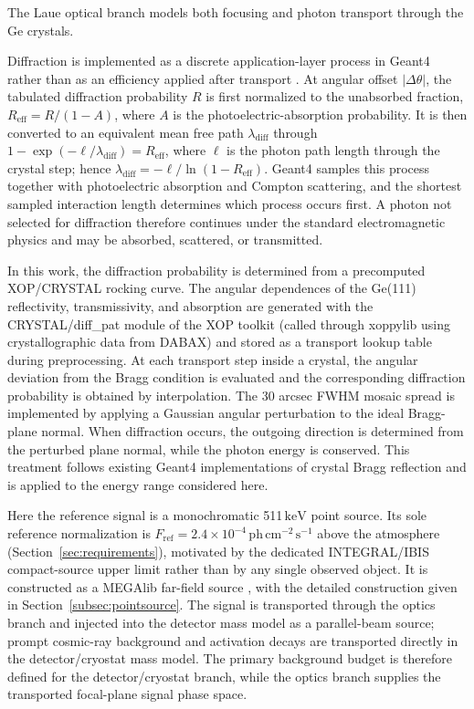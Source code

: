 \documentclass[11pt]{article}
\newcommand{\keV}{\ensuremath{\,\mathrm{keV}}}
\newcommand{\phcms}{\ensuremath{\,\mathrm{ph\,cm^{-2}\,s^{-1}}}}
\newcommand{\fref}{F_{\mathrm{ref}}}
\begin{document}
The Laue optical branch models both focusing and photon transport through the Ge crystals.

Diffraction is implemented as a discrete application-layer process in Geant4 rather than as an efficiency applied after transport \cite{Agostinelli2003,Allison2016}. At angular offset $|\Delta\theta|$, the tabulated diffraction probability $R$ is first normalized to the unabsorbed fraction, $R_{\mathrm{eff}}=R/(1-A)$, where $A$ is the photoelectric-absorption probability. It is then converted to an equivalent mean free path $\lambda_{\mathrm{diff}}$ through
$1-\exp(-\ell/\lambda_{\mathrm{diff}})=R_{\mathrm{eff}}$, where $\ell$ is the photon path length through the crystal step; hence $\lambda_{\mathrm{diff}}=-\ell/\ln(1-R_{\mathrm{eff}})$. Geant4 samples this process together with photoelectric absorption and Compton scattering, and the shortest sampled interaction length determines which process occurs first. A photon not selected for diffraction therefore continues under the standard electromagnetic physics and may be absorbed, scattered, or transmitted.

In this work, the diffraction probability is determined from a precomputed XOP/CRYSTAL rocking curve. The angular dependences of the Ge(111) reflectivity, transmissivity, and absorption are generated with the CRYSTAL/diff\_pat module of the XOP toolkit (called through xoppylib using crystallographic data from DABAX) \cite{SanchezDelRio2011XOP} and stored as a transport lookup table during preprocessing. At each transport step inside a crystal, the angular deviation from the Bragg condition is evaluated and the corresponding diffraction probability is obtained by interpolation. The 30 arcsec FWHM mosaic spread is implemented by applying a Gaussian angular perturbation to the ideal Bragg-plane normal. When diffraction occurs, the outgoing direction is determined from the perturbed plane normal, while the photon energy is conserved. This treatment follows existing Geant4 implementations of crystal Bragg reflection \cite{Guan2023BraggReflection,Reiazi2025G4BraggReflection} and is applied to the energy range considered here.

Here the reference signal is a monochromatic 511\keV{} point source. Its sole
reference normalization is $\fref=2.4\times10^{-4}\phcms$ above the atmosphere
(Section~\ref{sec:requirements}), motivated by the dedicated INTEGRAL/IBIS
compact-source upper limit \cite{DeCesare2011} rather than by any single
observed object. It is constructed as a MEGAlib far-field source
\cite{Zoglauer2006}, with the detailed construction given in
Section~\ref{subsec:pointsource}. The signal is transported through the optics
branch and injected into the detector mass model as a parallel-beam source;
prompt cosmic-ray background and activation decays are transported directly in
the detector/cryostat mass model. The primary background budget is therefore
defined for the detector/cryostat branch, while the optics branch supplies the
transported focal-plane signal phase space.
\end{document}
